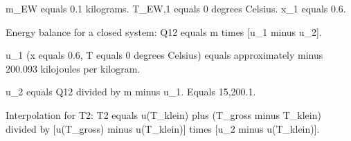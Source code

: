 m_EW equals 0.1 kilograms.  
T_EW,1 equals 0 degrees Celsius.  
x_1 equals 0.6.  

Energy balance for a closed system:  
Q12 equals m times [u_1 minus u_2].  

u_1 (x equals 0.6, T equals 0 degrees Celsius) equals approximately minus 200.093 kilojoules per kilogram.  

u_2 equals Q12 divided by m minus u_1.  
Equals 15,200.1.  

Interpolation for T2:  
T2 equals u(T_klein) plus (T_gross minus T_klein) divided by [u(T_gross) minus u(T_klein)] times [u_2 minus u(T_klein)].